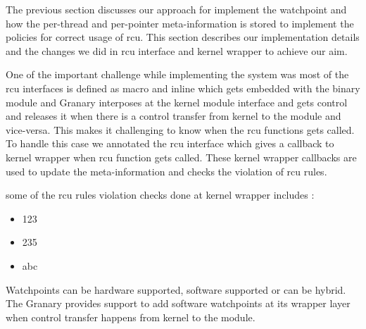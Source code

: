 The previous section discusses our approach for implement the watchpoint and how the per-thread and per-pointer meta-information is stored to implement the policies for correct usage of rcu. This section describes our implementation details and the changes we did in rcu interface and kernel wrapper to achieve our aim. 

One of the important challenge while implementing the system was most of the rcu interfaces is defined as macro and inline which gets embedded with the binary module and Granary interposes at the kernel module interface and gets control and releases it when there is a control transfer from kernel to the module and vice-versa. This makes it challenging to know when the rcu functions gets called. To handle this case we annotated the rcu interface which gives a callback to kernel wrapper when rcu function gets called. These kernel wrapper callbacks are used to update the meta-information and checks the violation of rcu rules. 

some of the rcu rules violation checks done at kernel wrapper includes :

\begin {itemize}
\item 123
\item 235
\item abc
\end{itemize}



Watchpoints can be hardware supported, software supported or can be hybrid. The Granary provides support to add software watchpoints at its wrapper layer when control transfer happens from kernel to the module.

